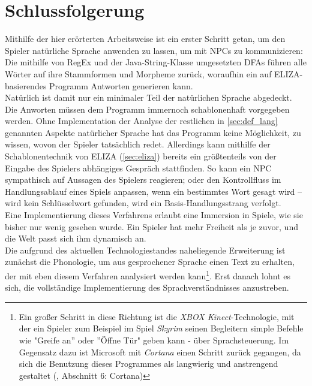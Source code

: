 \documentclass[12pt,twoside]{article}
\theoremstyle{plain}
\theoremstyle{definition}
\theoremstyle{remark}
\begin{document}
\section{Schlussfolgerung}
\label{sec:concl}
Mithilfe der hier erörterten Arbeitsweise ist ein erster Schritt getan, um den Spieler natürliche Sprache anwenden zu lassen, um mit NPCs zu kommunizieren:\\
Die mithilfe von RegEx und der Java-String-Klasse umgesetzten DFAs führen alle Wörter auf ihre Stammformen und Morpheme zurück, woraufhin ein auf ELIZA-basierendes Programm Antworten generieren kann.\\
Natürlich ist damit nur ein minimaler Teil der natürlichen Sprache abgedeckt.
Die Anworten müssen dem Programm immernoch schablonenhaft vorgegeben werden.
Ohne Implementation der Analyse der restlichen in \ref{sec:def_lang} genannten Aspekte natürlicher Sprache hat das Programm keine Möglichkeit, zu wissen, wovon der Spieler tatsächlich redet.
Allerdings kann mithilfe der Schablonentechnik von ELIZA (\ref{sec:eliza}) bereits ein größtenteils von der Eingabe des Spielers abhängiges Gespräch stattfinden.
So kann ein NPC sympathisch auf Aussagen des Spielers reagieren; oder den Kontrollfluss im Handlungsablauf eines Spiels anpassen, wenn ein bestimmtes Wort gesagt wird -- wird kein Schlüsselwort gefunden, wird ein Basis-Handlungsstrang verfolgt.\\
Eine Implementierung dieses Verfahrens erlaubt eine Immersion in Spiele, wie sie bisher nur wenig gesehen wurde.
Ein Spieler hat mehr Freiheit als je zuvor, und die Welt passt sich ihm dynamisch an.\\
Die aufgrund des aktuellen Technologiestandes naheliegende Erweiterung ist zunächst die Phonologie, um aus gesprochener Sprache einen Text zu erhalten, der mit eben diesem Verfahren analysiert werden kann\footnote{Ein großer Schritt in diese Richtung ist die \textit{XBOX Kinect}-Technologie, mit der ein Spieler zum Beispiel im Spiel \textit{Skyrim} seinen Begleitern simple Befehle wie "Greife an'' oder ''Öffne Tür" geben kann - über Sprachsteuerung. Im Gegensatz dazu ist Microsoft mit \textit{Cortana} einen Schritt zurück gegangen, da sich die Benutzung dieses Programmes als langwierig und anstrengend gestaltet (\cite{hauke}, Abschnitt 6: Cortana)}.
Erst danach lohnt es sich, die vollständige Implementierung des Sprachverständnisses anzustreben.

%
%
\newpage


\nocite{*}
\end{document}
